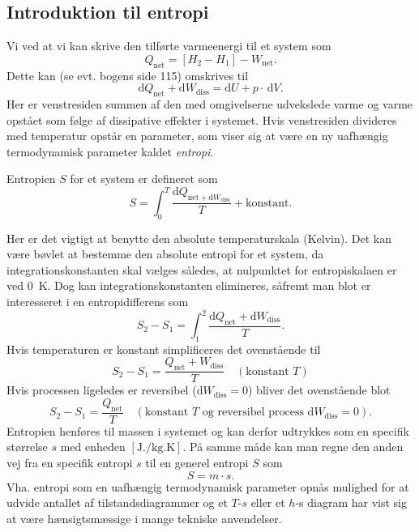 \subsection{Introduktion til entropi}
Vi ved at vi kan skrive den tilførte varmeenergi til et system som
\[ 
  Q_{\mathrm{net}} = [H_2 - H_1] - W_{\mathrm{net}}
.\]
Dette kan (se evt. bogens side 115) omskrives til
\[ 
\mathrm{d}Q_{\mathrm{net}} + \mathrm{d}W_{\mathrm{diss}} = \mathrm{d}U + p \cdot \, \mathrm{d}V
.\]
Her er venstresiden summen af den med omgivelserne udvekslede varme og varme opstået som følge af dissipative effekter i systemet. Hvis venstresiden divideres med temperatur opstår en parameter, som viser sig at være en ny uafhængig termodynamisk parameter kaldet \textit{entropi}.

\begin{definition}[Entropi]
  Entropien $S$ for et system er defineret som
  \[ 
  S = \int_{0}^{T} \frac{\mathrm{d}Q_{\mathrm{net} + \mathrm{d}W_{\mathrm{diss}}}}{T} + \mathrm{konstant}
  .\]
\end{definition}
Her er det vigtigt at benytte den absolute temperaturskala (Kelvin). Det kan være bøvlet at bestemme den absolute entropi for et system, da integrationskonstanten skal vælges således, at nulpunktet for entropiskalaen er ved \qty{0}{K}. Dog kan integrationskonstanten elimineres, såfremt man blot er interesseret i en entropidifferens som
\[ 
S_2 - S_1 = \int_{1}^{2} \frac{\mathrm{d}Q_{\mathrm{net}} + \mathrm{d}W_{\mathrm{diss}}}{T}
.\]
Hvis temperaturen er konstant simplificeres det ovenstående til
\begin{equation} \label{eq:entændt}
    S_2 - S_1 = \frac{Q_{\mathrm{net}} + W_{\mathrm{diss}}}{T} \quad (\text{konstant } T)
\end{equation}
Hvis processen ligeledes er reversibel ($\mathrm{d}W_{\mathrm{diss}} = 0$) bliver det ovenstående blot
\[ 
 S_2 - S_1 = \frac{Q_{\mathrm{net}}}{T} \quad (\text{konstant } T \text{ og reversibel process } \mathrm{d}W_{\mathrm{diss}} = 0)
.\]
Entropien henføres til massen i systemet og kan derfor udtrykkes som en specifik størrelse $s$ med enheden $[\unit{\J.\per\kg.\K}]$. På samme måde kan man regne den anden vej fra en specifik entropi $s$ til en generel entropi $S$ som
\[ 
S = m\cdot s
.\]
Vha. entropi som en uafhængig termodynamisk parameter opnås mulighed for at udvide antallet af tilstandsdiagrammer og et $T$-$s$ eller et $h$-s diagram har vist sig at være hænsigtsmæssige i mange tekniske anvendelser.

